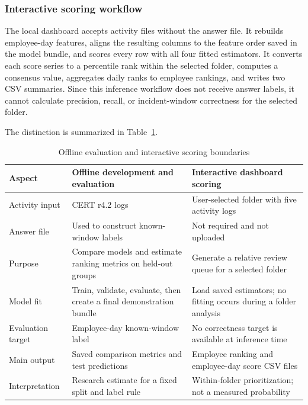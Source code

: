 \subsubsection{Interactive scoring workflow}
The local dashboard accepts activity files without the answer file. It
rebuilds employee-day features, aligns the resulting columns to the
feature order saved in the model bundle, and scores every row with all
four fitted estimators. It converts each score series to a percentile
rank within the selected folder, computes a consensus value, aggregates
daily ranks to employee rankings, and writes two CSV summaries. Since
this inference workflow does not receive answer labels, it cannot
calculate precision, recall, or incident-window correctness for the
selected folder.

The distinction is summarized in Table~\ref{tab:workflow-boundaries}.

\begin{table}[H]
\centering
\caption{Offline evaluation and interactive scoring boundaries}
\label{tab:workflow-boundaries}
\small
\begin{tabularx}{\textwidth}{|p{}|X|X|}
\hline
Aspect & Offline development and evaluation & Interactive dashboard scoring\\
\hline
Activity input & CERT r4.2 logs & User-selected folder with five activity logs\\
\hline
Answer file & Used to construct known-window labels & Not required and not uploaded\\
\hline
Purpose & Compare models and estimate ranking metrics on held-out groups & Generate a relative review queue for a selected folder\\
\hline
Model fit & Train, validate, evaluate, then create a final demonstration bundle & Load saved estimators; no fitting occurs during a folder analysis\\
\hline
Evaluation target & Employee-day known-window label & No correctness target is available at inference time\\
\hline
Main output & Saved comparison metrics and test predictions & Employee ranking and employee-day score CSV files\\
\hline
Interpretation & Research estimate for a fixed split and label rule & Within-folder prioritization; not a measured probability\\
\hline
\end{tabularx}
\end{table}


